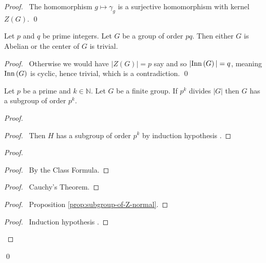\begin{proof}
\pf\ The homomorphism $g \mapsto \gamma_g$ is a surjective homomorphism with kernel $Z(G)$. \qed
\end{proof}

\begin{prop}
\label{prop:pq-abelian}
Let $p$ and $q$ be prime integers. Let $G$ be a group of order $pq$. Then either $G$ is Abelian or the center of $G$ is trivial.
\end{prop}

\begin{proof}
\pf\ Otherwise we would have $|Z(G)| = p$ say and so $|\mathrm{Inn} \left( {G} \right)| = q$, meaning $\mathrm{Inn} \left( {G} \right)$ is cyclic, hence trivial, which is a contradiction.
\qed
\end{proof}

\begin{thm}
Let $p$ be a prime and $k \in \mathbb{N}$. Let $G$ be a finite group. If $p^k$ divides $|G|$ then $G$ has a subgroup of order $p^k$.
\end{thm}

\begin{proof}
\pf
{}
\begin{proof}
	\pf\ Then $H$ has a subgroup of order $p^k$ by induction hypothesis .
\end{proof}
\begin{proof}
	\begin{proof}
		\pf\ By the Class Formula.
	\end{proof}
	\begin{proof}
		\pf\ Cauchy's Theorem.
	\end{proof}
	\begin{proof}
		\pf\ Proposition \ref{prop:subgroup-of-Z-normal}.
	\end{proof}
	\begin{proof}
		\pf\ Induction hypothesis .
	\end{proof}
\end{proof}
\qed
\end{proof}

